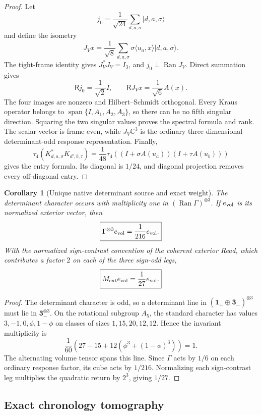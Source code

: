 \documentclass[11pt]{article}
\newtheorem{corollary}[theorem]{Corollary}
\theoremstyle{definition}
\theoremstyle{remark}
\newcommand{\C}{\mathbb C}
\newcommand{\Span}{\operatorname{span}}
\newcommand{\Ran}{\operatorname{Ran}}
\begin{document}
\begin{proof}
Let
\[
 j_0=\frac1{\sqrt{24}}\sum_{d,a,\sigma}|d,a,\sigma\rangle
\]
and define the isometry
\[
 J_Vx=\frac1{\sqrt8}\sum_{d,a,\sigma}
       \sigma\langle u_a,x\rangle|d,a,\sigma\rangle.
\]
The tight-frame identity gives $J_V^*J_V=I_3$, and $j_0\perp\Ran J_V$.
Direct summation gives
\[
 \mathsf Rj_0=\frac1{\sqrt2}I,
 \qquad
 \mathsf RJ_Vx=\frac1{\sqrt6}A(x).
\]
The four images are nonzero and Hilbert--Schmidt orthogonal.  Every Kraus
operator belongs to $\Span\{I,A_1,A_2,A_3\}$, so there can be no fifth singular
direction.  Squaring the two singular values proves the spectral formula and
rank.  The scalar vector is frame even, while $J_V\C^3$ is the ordinary
three-dimensional determinant-odd response representation.  Finally,
\[
 \tau_4(K_{d,a,\sigma}^*K_{d',b,\tau})
 =\frac1{48}\tau_4((I+\sigma A(u_a))(I+\tau A(u_b)))
\]
gives the entry formula.  Its diagonal is $1/24$, and diagonal projection
removes every off-diagonal entry.
\end{proof}

\begin{corollary}[Unique native determinant source and exact weight]
\label{cor:native-determinant-master}
The determinant character occurs with multiplicity one in
$(\Ran\Gamma)^{\otimes3}$.  If $e_{\rm vol}$ is its normalized exterior vector,
then
\[
 \boxed{\Gamma^{\otimes3}e_{\rm vol}=\frac1{216}e_{\rm vol}.}
\]
With the normalized sign-contrast convention of the coherent exterior Read,
which contributes a factor $2$ on each of the three sign-odd legs,
\[
 \boxed{M_{\rm ext}e_{\rm vol}=\frac1{27}e_{\rm vol}.}
\]
\end{corollary}

\begin{proof}
The determinant character is odd, so a determinant line in
$(\mathbf1_+\oplus\mathbf3_-)^{\otimes3}$ must lie in
$\mathbf3_-^{\otimes3}$.  On the rotational subgroup $A_5$, the standard
character has values $3,-1,0,\phi,1-\phi$ on classes of sizes
$1,15,20,12,12$.  Hence the invariant multiplicity is
\[
 \frac1{60}\left(27-15+12(\phi^3+(1-\phi)^3)\right)=1.
\]
The alternating volume tensor spans this line.  Since $\Gamma$ acts by $1/6$
on each ordinary response factor, its cube acts by $1/216$.  Normalizing each
sign-contrast leg multiplies the quadratic return by $2^3$, giving $1/27$.
\end{proof}

\subsection{Exact chronology tomography}
\end{document}
